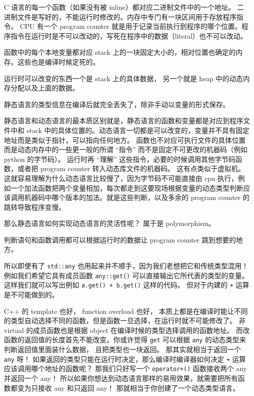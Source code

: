 C 语言的每一个函数（如果没有被 inline）都对应二进制文件中的一个地址。 二进制文件是写好的，不能运行时修改的。内存中专门有一块区间用于存放程序指令。 CPU 有一个 program counter 就是用于记录当前执行到程序的哪个位置。程序指令在运行时是不可以改动的，写死在程序中的数据（literal）也不可以改动。

函数中的每个本地变量都对应 stack 上的一块固定大小的，相对位置也确定的内存。这些也是编译时候定死的。

运行时可以改变的东西一个是 stack 上的具体数据， 另一个就是 heap 中的动态内存分配以及上面的数据。

静态语言的类型信息在编译后就完全丢失了，除非手动以变量的形式保存。

静态语言和动态语言的最本质区别就是，静态语言的函数和变量都是对应到程序文件中和 stack 中的具体位置的。动态语言一切都是可以改变的，变量并不具有固定地址而是类似于指针，可以指向任何地方。 函数也不对应可执行文件的具体位置而是动态内存中的一些更一般的所谓 “指令” 而不是固定不可更改的机器码（例如 python 的字节码）。 运行时再 “理解” 这些指令，必要的时候调用其他字节码函数，或者把 program counter 转入动态库文件的机器码。 这有点类似于虚拟机。 这就容易理解为什么动态语言比较慢了，因为字节码不可能直接由 cpu 执行，例如一个加法函数把两个变量相加，每次都走到这要现场根据变量的动态类型判断应该调用机器码中哪个版本的加法。就是这些判断，以及多余的 program counter 的跳转导致程序变慢。

那么静态语言如何实现动态语言的灵活性呢？ 属于是 polymorphism。

判断语句和函数调用都可以根据运行时的数据让 program counter 跳到想要的地方。

所以即使有了 \verb`std::any` 也用起来并不顺手，因为我们老想把它和传统类型混用！例如我们希望它具有成员函数 \verb`any::get()` 可以直接输出它所代表的类型的变量。 这样我们就可以写出例如 \verb`a.get() + b.get()` 这样的代码。 但对于内建的 \verb`+` 运算是不可能做到的。

C++ 的 template 也好， function overload 也好， 本质上都是在编译时能让不同的类型自动选择不同的函数，但是函数一旦选择，在运行时就不可能修改了。 非 virtual 的成员函数也是根据 object 在编译时候的类型选择调用的函数地址。 而改函数的返回值的长度首先不能改变。你或许觉得 \verb`get` 可以根据 \verb`any` 的动态类型来判断返回值里面装什么数据， 且把类型也一块返回。 那其实就相当于返回一个 \verb`any` 呀！ 如果返回的类型只能在运行时决定，那么编译时编译器如何决定 \verb`+` 运算应该调用哪个地址的函数呢？ 那我们只好写一个 \verb`operator+()` 函数接收两个 any 并返回一个 any！ 所以如果你想达到动态语言那样的易用效果，就需要把所有函数都变为只接收 any 和只返回 any！ 那就相当于你创建了一个动态类型语言。
